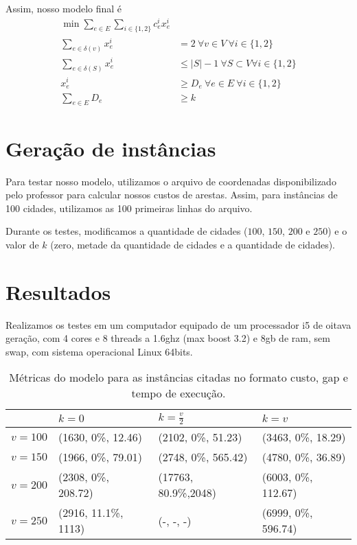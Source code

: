 \documentclass[11pt]{article}
\theoremstyle{definition}
\theoremstyle{definition}
\theoremstyle{remark}
\theoremstyle{remark}
\theoremstyle{remark}
\theoremstyle{remark}
\theoremstyle{definition}
\begin{document}
Assim, nosso modelo final é
\begin{align*}
\min \sum \limits_{e \in E} \sum \limits_{i \in \{1,2\}} c_{e}^{i} x_{e}^{i}& \\
\sum \limits_{e \in \delta(v)} x_{e}^{i} &= 2 \ \forall v \in V \ \forall i \in \{1,2\} \\
\sum \limits_{e \in \delta(S)} x_{e}^{i} &\leq |S| -1 \ \forall S \subset V \forall i \in \{1,2\} \\
x_{e}^{i} &\geq D_{e} \ \forall e \in E \ \forall i \in \{1,2\} \\
\sum \limits_{e \in E} D_{e} &\geq k
\end{align*}

\section*{Geração de instâncias}
\label{sec:org682535d}
Para testar nosso modelo, utilizamos o arquivo de coordenadas disponibilizado pelo professor para calcular nossos custos de arestas. Assim, para instâncias de 100 cidades, utilizamos as 100 primeiras linhas do arquivo.

Durante os testes, modificamos a quantidade de cidades (\(100\), \(150\), \(200\) e \(250\)) e o valor de \(k\) (zero, metade da quantidade de cidades e a quantidade de cidades).
\section*{Resultados}
\label{sec:org130df22}

Realizamos os testes em um computador equipado de um processador i5 de oitava geração, com 4 cores e 8 threads a 1.6ghz (max boost 3.2) e 8gb de ram, sem swap, com sistema operacional Linux 64bits. 


\begin{table}[htbp]
\caption{Métricas do modelo para as instâncias citadas no formato custo, gap e tempo de execução.}
\centering
\begin{tabular}{llll}
 & \(k=0\) & \(k=\frac{v}{2}\) & \(k = v\)\\
\hline
\(v = 100\) & (1630, 0\%, 12.46) & (2102, 0\%, 51.23) & (3463, 0\%, 18.29)\\
\(v = 150\) & (1966, 0\%, 79.01) & (2748, 0\%, 565.42) & (4780, 0\%, 36.89)\\
\(v = 200\) & (2308, 0\%, 208.72) & (17763, 80.9\%,2048) & (6003, 0\%, 112.67)\\
\(v = 250\) & (2916, 11.1\%, 1113) & (-, -, -) & (6999, 0\%, 596.74)\\
\end{tabular}
\end{table}
\end{document}

